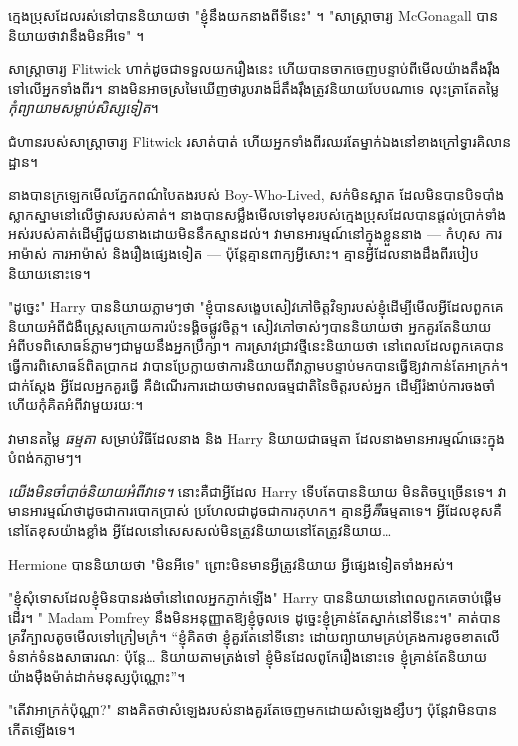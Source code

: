 {ក្មេងប្រុសដែលរស់នៅបាននិយាយថា "ខ្ញុំនឹងយកនាងពីទីនេះ" ។ "សាស្រ្តាចារ្យ McGonagall បាននិយាយថាវានឹងមិនអីទេ" ។

សាស្រ្តាចារ្យ Flitwick ហាក់ដូចជាទទួលយករឿងនេះ ហើយបានចាកចេញបន្ទាប់ពីមើលយ៉ាងតឹងរ៉ឹងទៅលើអ្នកទាំងពីរ។ នាង​មិន​អាច​ស្រមៃ​ឃើញ​ថា​រូបរាង​ដ៏​តឹងរ៉ឹង​ត្រូវ​និយាយ​បែប​ណា​ទេ លុះ​ត្រា​តែ​តម្លៃ \emph{កុំ​ព្យាយាម​សម្លាប់​សិស្ស​ទៀត}។

ជំហាន​របស់​សាស្ត្រាចារ្យ Flitwick រសាត់​បាត់ ហើយ​អ្នក​ទាំង​ពីរ​ឈរ​តែ​ម្នាក់​ឯង​នៅ​ខាង​ក្រៅ​ទ្វារ​គិលានដ្ឋាន។

នាងបានក្រឡេកមើលភ្នែកពណ៌បៃតងរបស់ Boy-Who-Lived, សក់មិនស្អាត ដែលមិនបានបិទបាំងស្លាកស្នាមនៅលើថ្ងាសរបស់គាត់។ នាងបានសម្លឹងមើលទៅមុខរបស់ក្មេងប្រុសដែលបានផ្តល់ប្រាក់ទាំងអស់របស់គាត់ដើម្បីជួយនាងដោយមិននឹកស្មានដល់។ វា​មាន​អារម្មណ៍​នៅ​ក្នុង​ខ្លួន​នាង — កំហុស ការ​អាម៉ាស់ ការ​អាម៉ាស់ និង​រឿង​ផ្សេង​ទៀត — ប៉ុន្តែ​គ្មាន​ពាក្យ​អ្វី​សោះ។ គ្មានអ្វីដែលនាងដឹងពីរបៀបនិយាយនោះទេ។

"ដូច្នេះ" Harry បាននិយាយភ្លាមៗថា "ខ្ញុំបានសង្ខេបសៀវភៅចិត្តវិទ្យារបស់ខ្ញុំដើម្បីមើលអ្វីដែលពួកគេនិយាយអំពីជំងឺស្ត្រេសក្រោយការប៉ះទង្គិចផ្លូវចិត្ត។ សៀវភៅចាស់ៗបាននិយាយថា អ្នកគួរតែនិយាយអំពីបទពិសោធន៍ភ្លាមៗជាមួយនឹងអ្នកប្រឹក្សា។ ការ​ស្រាវជ្រាវ​ថ្មី​នេះ​និយាយ​ថា នៅ​ពេល​ដែល​ពួក​គេ​បាន​ធ្វើ​ការ​ពិសោធន៍​ពិត​ប្រាកដ វា​បាន​ប្រែ​ក្លាយ​ថា​ការ​និយាយ​ពី​វា​ភ្លាម​បន្ទាប់​មក​បាន​ធ្វើ​ឱ្យ​វា​កាន់តែ​អាក្រក់។ ជាក់ស្តែង អ្វីដែលអ្នកគួរធ្វើ គឺដំណើរការដោយថាមពលធម្មជាតិនៃចិត្តរបស់អ្នក ដើម្បីរំងាប់ការចងចាំ ហើយកុំគិតអំពីវាមួយរយៈ។

វាមានតម្លៃ \emph{ធម្មតា} សម្រាប់វិធីដែលនាង និង Harry និយាយជាធម្មតា ដែលនាងមានអារម្មណ៍ឆេះក្នុងបំពង់កភ្លាមៗ។

\emph{យើងមិនចាំបាច់និយាយអំពីវាទេ។} នោះគឺជាអ្វីដែល Harry ទើបតែបាននិយាយ មិនតិចឬច្រើនទេ។ វា​មាន​អារម្មណ៍​ថា​ដូច​ជា​ការ​បោក​ប្រាស់ ប្រហែល​ជា​ដូច​ជា​ការ​កុហក។ គ្មានអ្វី\emph{គឺ}ធម្មតាទេ។ អ្វី​ដែល​ខុស​គឺ​នៅ​តែ​ខុស​យ៉ាង​ខ្លាំង អ្វី​ដែល​នៅ​សេសសល់​មិន​ត្រូវ​និយាយ​នៅ​តែ​ត្រូវ​និយាយ…

Hermione បាននិយាយថា "មិនអីទេ" ព្រោះមិនមានអ្វីត្រូវនិយាយ អ្វីផ្សេងទៀតទាំងអស់។

"ខ្ញុំសុំទោសដែលខ្ញុំមិនបានរង់ចាំនៅពេលអ្នកភ្ញាក់ឡើង" Harry បាននិយាយនៅពេលពួកគេចាប់ផ្តើមដើរ។ " Madam Pomfrey នឹងមិនអនុញ្ញាតឱ្យខ្ញុំចូលទេ ដូច្នេះខ្ញុំគ្រាន់តែស្នាក់នៅទីនេះ។" គាត់​បាន​គ្រវីក្បាល​តូច​មើល​ទៅ​ក្រៀមក្រំ។ “ខ្ញុំគិតថា ខ្ញុំគួរតែនៅទីនោះ ដោយព្យាយាមគ្រប់គ្រងការខូចខាតលើទំនាក់ទំនងសាធារណៈ ប៉ុន្តែ… និយាយតាមត្រង់ទៅ ខ្ញុំមិនដែលពូកែរឿងនោះទេ ខ្ញុំគ្រាន់តែនិយាយយ៉ាងម៉ឺងម៉ាត់ដាក់មនុស្សប៉ុណ្ណោះ”។

"តើវាអាក្រក់ប៉ុណ្ណា?" នាង​គិត​ថា​សំឡេង​របស់​នាង​គួរ​តែ​ចេញ​មក​ដោយ​សំឡេង​ខ្សឹបៗ ប៉ុន្តែ​វា​មិន​បាន​កើត​ឡើង​ទេ។

}
